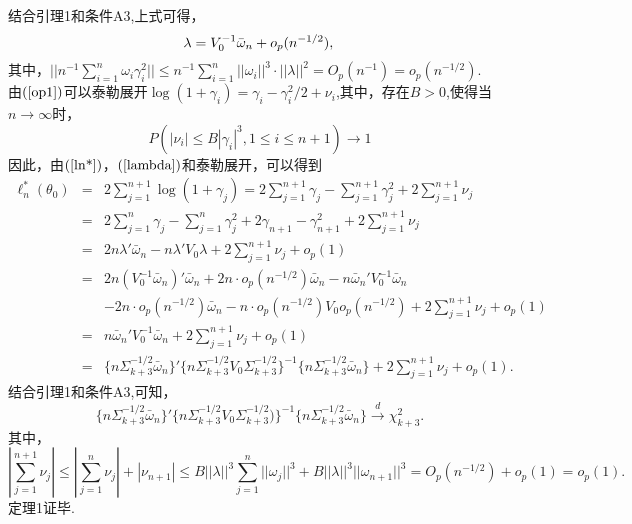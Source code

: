 \documentclass[onecolumn]{ctexart}	%
\begin{document}
结合引理1和条件A3,上式可得，
\begin{equation}
\lambda=V_0^{-1}\bar{\omega}_{n}+o_p(n^{-1/2}),\label{lambda}\\
\end{equation}
其中，$||n^{-1}\sum^{n}_{i=1}\omega_i\gamma_i^2||\le n^{-1}\sum^{n}_{i=1}||\omega_i||^3 \cdot||\lambda||^2=O_p(n^{-1})=o_p(n^{-1/2})$.\\
由$\rm(\ref{op1}) $可以泰勒展开$\log(1+\gamma_i)=\gamma_i-\gamma_i^2/2+\nu_i$,其中，存在$B>0$,使得当$n \to \infty$时，
$$P(|\nu_i| \le B|\gamma_i|^3,1 \le i \le n+1) \to 1$$
因此，由$\rm(\ref{ln*}) $，$\rm(\ref{lambda}) $和泰勒展开，可以得到
\begin{eqnarray*}
\ell^*_n(\theta_0)& = & 2\sum_{j=1}^{n+1} \log(1+\gamma_j)=2\sum_{j=1}^{n+1}\gamma_j-\sum_{j=1}^{n+1}\gamma_j^2+2\sum_{j=1}^{n+1}\nu_j\\
& = & 2\sum_{j=1}^{n}\gamma_j-\sum_{j=1}^{n}\gamma_j^2+2\gamma_{n+1}-\gamma^2_{n+1}+2\sum_{j=1}^{n+1}\nu_j\\
& = & 2n\lambda'\bar{\omega}_n-n\lambda'V_0\lambda+2\sum_{j=1}^{n+1}\nu_j +o_p(1)\\
& = & 2n(V_0^{-1}\bar{\omega}_{n})'\bar{\omega}_n+2n\cdot o_p(n^{-1/2})\bar{\omega}_n-n\bar{\omega}_{n}'V_0^{-1}\bar{\omega}_{n}\\
&     &-2n\cdot o_p(n^{-1/2})\bar{\omega}_n-n \cdot o_p(n^{-1/2})V_0o_p(n^{-1/2})+2\sum_{j=1}^{n+1}\nu_j +o_p(1)\\
& = & n\bar{\omega}_{n}'V_0^{-1}\bar{\omega}_n+2\sum_{j=1}^{n+1}\nu_j +o_p(1)\\
&=&  \{n\Sigma^{-1/2}_{k+3}\bar{\omega}_{n}\}'\{n\Sigma^{-1/2}_{k+3} V_0 \Sigma^{-1/2}_{k+3}\}^{-1}\{n\Sigma^{-1/2}_{k+3}\bar{\omega}_{n}\}+2\sum_{j=1}^{n+1}\nu_j +o_p(1).
\end{eqnarray*}
结合引理1和条件A3,可知，
\[
 \{n\Sigma^{-1/2}_{k+3}\bar{\omega}_{n}\}'  \{n\Sigma^{-1/2}_{k+3} V_0 \Sigma^{-1/2}_{k+3})\}^{-1}\{n\Sigma^{-1/2}_{k+3}\bar{\omega}_{n}\} \stackrel{d}{\longrightarrow}\chi^2_{k+3}.
\]
其中，
\[
|\sum_{j=1}^{n+1}\nu_j| \le |\sum_{j=1}^{n}\nu_j|+|\nu_{n+1}|\leq B ||\lambda||^3\sum_{j=1}^{n}||\omega_{j}||^3+B ||\lambda||^3||\omega_{n+1}||^3 =O_p(n^{-1/2})+o_p(1)=o_p(1).
\]
 定理1证毕.
\end{document}

